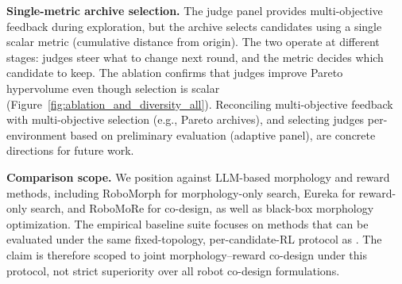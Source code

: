 \textbf{Single-metric archive selection.} The judge panel provides multi-objective feedback during exploration, but the archive selects candidates using a single scalar metric (cumulative distance from origin). The two operate at different stages: judges steer what to change next round, and the metric decides which candidate to keep. The ablation confirms that judges improve Pareto hypervolume even though selection is scalar (Figure~\ref{fig:ablation_and_diversity_all}). Reconciling multi-objective feedback with multi-objective selection (e.g., Pareto archives), and selecting judges per-environment based on preliminary evaluation (adaptive panel), are concrete directions for future work.

\textbf{Comparison scope.} We position \abbrev{} against LLM-based morphology and reward methods, including RoboMorph for morphology-only search, Eureka for reward-only search, and RoboMoRe for co-design, as well as black-box morphology optimization. The empirical baseline suite focuses on methods that can be evaluated under the same fixed-topology, per-candidate-RL protocol as \abbrev{}. The claim is therefore scoped to joint morphology--reward co-design under this protocol, not strict superiority over all robot co-design formulations.
